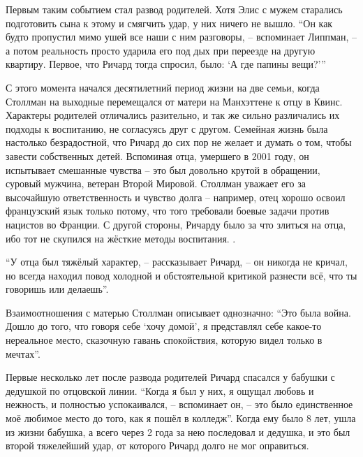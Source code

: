 Первым таким событием стал развод родителей. Хотя Элис с мужем старались подготовить сына к этому и смягчить удар, у них ничего не вышло. \enquote{Он как будто пропустил мимо ушей все наши с ним разговоры, -- вспоминает Липпман, -- а потом реальность просто ударила его под дых при переезде на другую квартиру. Первое, что Ричард тогда спросил, было: `А где папины вещи?'\hspace{0.01in}}

С этого момента начался десятилетний период жизни на две семьи, когда Столлман на выходные перемещался от матери на Манхэттене к отцу в Квинс. Характеры родителей отличались разительно, и так же сильно различались их подходы к воспитанию, не согласуясь друг с другом. Семейная жизнь была настолько безрадостной, что Ричард до сих пор не желает и думать о том, чтобы завести собственных детей. Вспоминая отца, умершего в 2001 году, он испытывает смешанные чувства -- это был довольно крутой в обращении, суровый мужчина, ветеран Второй Мировой. Столлман уважает его за высочайшую ответственность и чувство долга -- например, отец хорошо освоил французский язык только потому, что того требовали боевые задачи против нацистов во Франции. С другой стороны, Ричарду было за что злиться на отца, ибо тот не скупился на жёсткие методы воспитания. .

\enquote{У отца был тяжёлый характер, -- рассказывает Ричард, -- он никогда не кричал, но всегда находил повод холодной и обстоятельной критикой разнести всё, что ты говоришь или делаешь}.

Взаимоотношения с матерью Столлман описывает однозначно: \enquote{Это была война. Дошло до того, что говоря себе `хочу домой', я представлял себе какое-то нереальное место, сказочную гавань спокойствия, которую видел только в мечтах}.

Первые несколько лет после развода родителей Ричард спасался у бабушки с дедушкой по отцовской линии. \enquote{Когда я был у них, я ощущал любовь и нежность, и полностью успокаивался, -- вспоминает он, -- это было единственное моё любимое место до того, как я пошёл в колледж}. Когда ему было 8 лет, ушла из жизни бабушка, а всего через 2 года за нею последовал и дедушка, и это был второй тяжелейший удар, от которого Ричард долго не мог оправиться.


